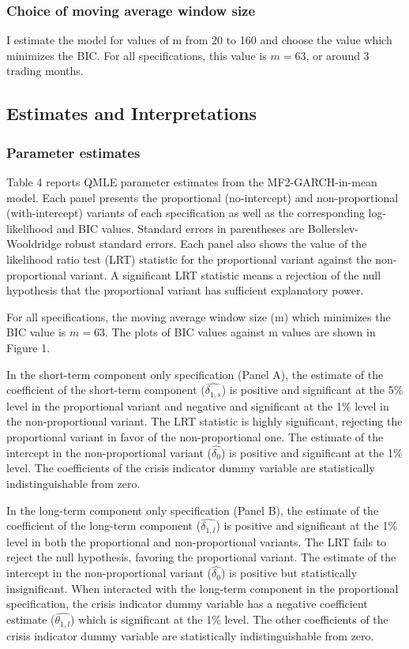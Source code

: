 \documentclass[12pt]{article}
\begin{document}
\subsubsection{Choice of moving average window size}
I estimate the model for values of m from 20 to 160 and choose the value which minimizes the BIC. For all specifications, this value is $m=63$, or around 3 trading months.
\subsection{Estimates and Interpretations}
\subsubsection{Parameter estimates}
Table 4 reports QMLE parameter estimates from the MF2-GARCH-in-mean model. Each panel presents the proportional (no-intercept) and non-proportional (with-intercept) variants of each specification as well as the corresponding log-likelihood and BIC values. Standard errors in parentheses are Bollerslev-Wooldridge robust standard errors. Each panel also shows the value of the likelihood ratio test (LRT) statistic for the proportional variant against the non-proportional variant. A significant LRT statistic means a rejection of the null hypothesis that the proportional variant has sufficient explanatory power.\par
For all specifications, the moving average window size (m) which minimizes the BIC value is $m=63$. The plots of BIC values against m values are shown in Figure 1.\par
In the short-term component only specification (Panel A), the estimate of the coefficient of the short-term component ($\widehat{\delta_{1,s}}$) is positive and significant at the 5\% level in the proportional variant and negative and significant at the 1\% level in the non-proportional variant. The LRT statistic is highly significant, rejecting the proportional variant in favor of the non-proportional one. The estimate of the intercept in the non-proportional variant ($\widehat{\delta_0}$) is positive and significant at the 1\% level. The coefficients of the crisis indicator dummy variable are statistically indistinguishable from zero.\par
In the long-term component only specification (Panel B), the estimate of the coefficient of the long-term component ($\widehat{\delta_{1,l}}$) is positive and significant at the 1\% level in both the proportional and non-proportional variants. The LRT fails to reject the null hypothesis, favoring the proportional variant. The estimate of the intercept in the non-proportional variant ($\widehat{\delta_0}$) is positive but statistically insignificant.  When interacted with the long-term component in the proportional specification, the crisis indicator dummy variable has a negative coefficient estimate ($\widehat{\theta_{1,l}}$) which is significant at the 1\% level. The other coefficients of the crisis indicator dummy variable are statistically indistinguishable from zero.\par
\end{document}
